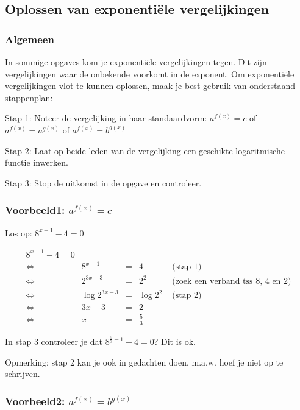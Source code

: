 \subsection{Oplossen van exponenti\"ele vergelijkingen}


\subsubsection{Algemeen}

In sommige opgaves kom je exponenti\"ele vergelijkingen tegen. Dit zijn
vergelijkingen waar de onbekende voorkomt in de exponent. Om exponenti\"ele
vergelijkingen vlot te kunnen oplossen, maak je best gebruik van onderstaand
stappenplan:\medskip{}


Stap 1: Noteer de vergelijking in haar standaardvorm: ${\displaystyle a^{f(x)}=c}$
of ${\displaystyle a^{f(x)}=a^{g(x)}}$ of ${\displaystyle a^{f(x)}=b^{g(x)}}$ 

Stap 2: Laat op beide leden van de vergelijking een geschikte logaritmische
functie inwerken.

Stap 3: Stop de uitkomst in de opgave en controleer.


\subsubsection{Voorbeeld1: ${\displaystyle a^{f(x)}=c}$}

Los op: ${\displaystyle 8^{x-1}-4=0}$

\[
{\displaystyle \begin{split}8^{x-1}-4=0\\
\Longleftrightarrow & 8^{x-1} & = & 4 & \text{ (stap 1)}\\
\Longleftrightarrow & 2^{3x-3} & = & 2^{2} & \text{ (zoek een verband tss 8, 4 en 2)}\\
\Longleftrightarrow & \log2^{3x-3} & = & \log2^{2} & \text{ (stap 2)}\\
\Longleftrightarrow & 3x-3 & = & 2 & \text{}\\
\Longleftrightarrow & x & = & \frac{5}{3}
\end{split}
}
\]


In stap 3 controleer je dat ${\displaystyle 8^{\frac{5}{3}-1}-4=0}$?
Dit is ok.

Opmerking: stap 2 kan je ook in gedachten doen, m.a.w. hoef je niet
op te schrijven.


\subsubsection{Voorbeeld2: ${\displaystyle a^{f(x)}=b^{g(x)}}$ }

